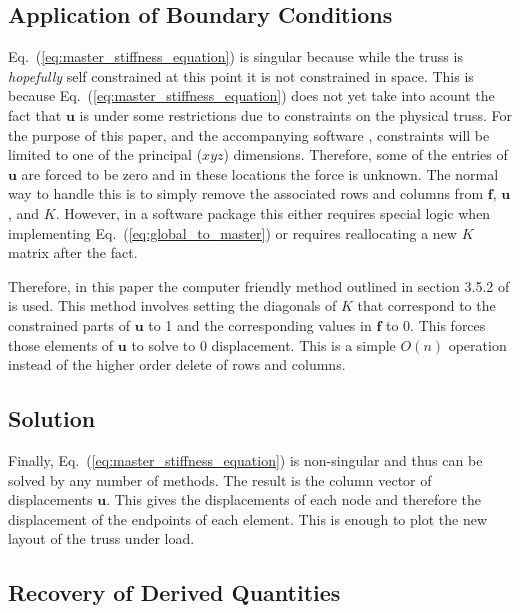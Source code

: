 \documentclass{article}
\begin{document}
\subsection{Application of Boundary Conditions}

Eq.~(\ref{eq:master_stiffness_equation}) is singular because while the truss
is \emph{hopefully} self constrained at this point it is not constrained in
space.  This is because Eq.~(\ref{eq:master_stiffness_equation}) does not yet
take into acount the fact that $\mathbf{u}$ is under some restrictions due to
constraints on the physical truss.  For the purpose of this paper, and the
accompanying software \parencite{shannon2016}, constraints will be limited to
one of the principal ($xyz$) dimensions.  Therefore, some of the entries of
$\mathbf{u}$ are forced to be zero and in these locations the force is
unknown.  The normal way to handle this is to simply remove the associated
rows and columns from $\mathbf{f}$, $\mathbf{u}$, and $K$.  However, in a
software package this either requires special logic when implementing
Eq.~(\ref{eq:global_to_master}) or requires reallocating a new $K$ matrix
after the fact.

Therefore, in this paper the computer friendly method outlined in section
3.5.2 of \cite{felippa2004ch3} is used.  This method involves setting the
diagonals of $K$ that correspond to the constrained parts of $\mathbf{u}$ to 1
and the corresponding values in $\mathbf{f}$ to 0.  This forces those elements
of $\mathbf{u}$ to solve to 0 displacement.  This is a simple $O(n)$ operation
instead of the higher order delete of rows and columns.




\subsection{Solution}

Finally, Eq.~(\ref{eq:master_stiffness_equation}) is non-singular and thus can
be solved by any number of methods.  The result is the column vector of
displacements $\mathbf{u}$.  This gives the displacements of each node and
therefore the displacement of the endpoints of each element.  This is enough
to plot the new layout of the truss under load.




\subsection{Recovery of Derived Quantities}
\end{document}
